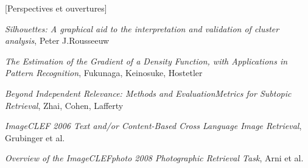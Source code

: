 \documentclass{article}
\begin{document}
[Perspectives et ouvertures]

\begin{thebibliography}{9}
\textit{Silhouettes: A graphical aid to the interpretation and validation of cluster analysis},
Peter J.Rousseeuw

\textit{The Estimation of the Gradient of a Density Function, with Applications in Pattern Recognition}, Fukunaga, Keinosuke, Hostetler

\textit{Beyond Independent Relevance: Methods and EvaluationMetrics for Subtopic Retrieval}, Zhai, Cohen, Lafferty

\textit{ImageCLEF 2006
Text and/or Content-Based Cross Language Image Retrieval}, Grubinger et al.

\textit{Overview of the ImageCLEFphoto 2008  
Photographic Retrieval Task}, Arni et al.
\end{thebibliography}
\end{document}
